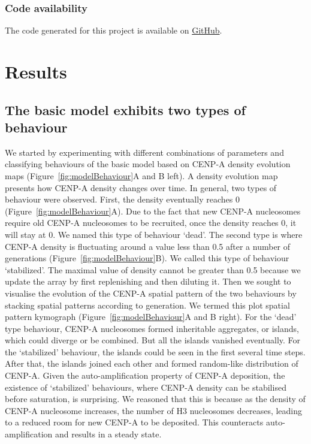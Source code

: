 \subsubsection{Code availability}

The code generated for this project is available on \href{https://github.com/ChuanliHuang/project_cenp_a}{GitHub}. 

\section{Results}
\subsection{The basic model exhibits two types of behaviour}

We started by experimenting with different combinations of parameters and classifying behaviours of the basic model based on CENP-A density evolution maps (Figure~\ref{fig:modelBehaviour}A and B left). A density evolution map presents how CENP-A density changes over time. In general, two types of behaviour were observed. First, the density eventually
reaches 0 (Figure~\ref{fig:modelBehaviour}A). Due to the fact that new CENP-A nucleosomes require old CENP-A nucleosomes to be recruited, once the density reaches 0, it will stay at 0. We named this type of behaviour ‘dead’. The second type is where CENP-A density is fluctuating around a value less than 0.5 after a number of generations (Figure~\ref{fig:modelBehaviour}B). We called this type of behaviour ‘stabilized’. The maximal value of density cannot be greater than 0.5 because we update the array by first replenishing and then diluting it. Then we sought to visualise the evolution of the CENP-A spatial pattern of the two behaviours by stacking spatial patterns according to generation. We termed this plot spatial pattern kymograph (Figure~\ref{fig:modelBehaviour}A and B right). For the ‘dead’ type behaviour, CENP-A nucleosomes formed inheritable aggregates, or islands, which could diverge or be combined. But all the islands vanished eventually. For the ‘stabilized’ behaviour, the islands could be seen in the first several time steps. After that, the islands joined each other and formed random-like distribution of CENP-A. Given the auto-amplification property of CENP-A deposition, the existence of ‘stabilized’ behaviours, where CENP-A density can be stabilised before saturation, is surprising. We reasoned that this is because as the density of CENP-A nucleosome increases, the number of H3 nucleosomes decreases, leading to a reduced room for new CENP-A to be deposited. This counteracts auto-amplification and results in a steady state. 

